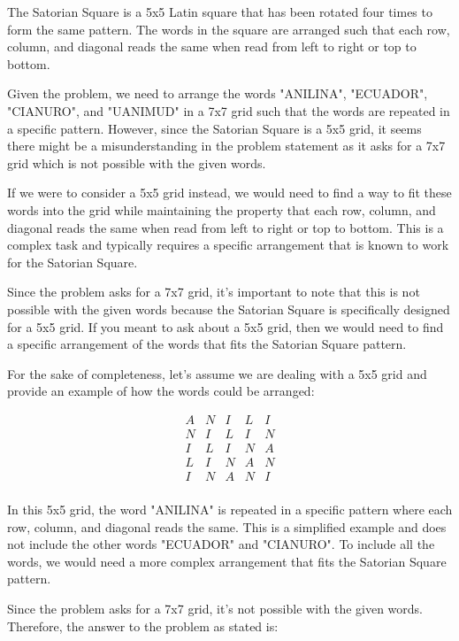 The Satorian Square is a 5x5 Latin square that has been rotated four times to form the same pattern. The words in the square are arranged such that each row, column, and diagonal reads the same when read from left to right or top to bottom.

Given the problem, we need to arrange the words "ANILINA", "ECUADOR", "CIANURO", and "UANIMUD" in a 7x7 grid such that the words are repeated in a specific pattern. However, since the Satorian Square is a 5x5 grid, it seems there might be a misunderstanding in the problem statement as it asks for a 7x7 grid which is not possible with the given words.

If we were to consider a 5x5 grid instead, we would need to find a way to fit these words into the grid while maintaining the property that each row, column, and diagonal reads the same when read from left to right or top to bottom. This is a complex task and typically requires a specific arrangement that is known to work for the Satorian Square.

Since the problem asks for a 7x7 grid, it's important to note that this is not possible with the given words because the Satorian Square is specifically designed for a 5x5 grid. If you meant to ask about a 5x5 grid, then we would need to find a specific arrangement of the words that fits the Satorian Square pattern.

For the sake of completeness, let's assume we are dealing with a 5x5 grid and provide an example of how the words could be arranged:

\[
\begin{array}{ccccc}
A & N & I & L & I \\
N & I & L & I & N \\
I & L & I & N & A \\
L & I & N & A & N \\
I & N & A & N & I \\
\end{array}
\]

In this 5x5 grid, the word "ANILINA" is repeated in a specific pattern where each row, column, and diagonal reads the same. This is a simplified example and does not include the other words "ECUADOR" and "CIANURO". To include all the words, we would need a more complex arrangement that fits the Satorian Square pattern.

Since the problem asks for a 7x7 grid, it's not possible with the given words. Therefore, the answer to the problem as stated is:


